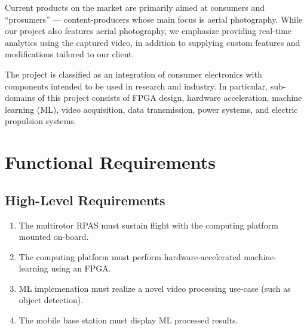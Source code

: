 \documentclass[10pt,letterpaper]{article}
\begin{document}
Current products on the market are primarily aimed at consumers and ``prosumers'' --- content-producers whose main focus is aerial photography. While our project also features aerial photography, we emphasize providing real-time analytics using the captured video, in addition to supplying custom features and modifications tailored to our client.

The project is classified as an integration of consumer electronics with components intended to be used in research and industry. In particular,  sub-domains of this project consists of FPGA design, hardware acceleration, machine learning (ML), video acquisition, data transmission, power systems, and electric propulsion systems. 

\newpage
\section{Functional Requirements}\label{section:funcreq} 

\subsection{High-Level Requirements}
\begin{enumerate}[label=F.HL.\arabic*, wide=1cm, widest=3cm, leftmargin=*, font=\bfseries, noitemsep,topsep=0pt, parsep=4pt, partopsep=0pt]
    \item The multirotor RPAS must sustain flight with the computing platform mounted on-board.
    \item The computing platform must perform hardware-accelerated machine-learning using an FPGA.
    \item ML implemenation must realize a novel video processing use-case (such as object detection).
    \item The mobile base station must display ML processed results.
\end{enumerate}
\end{document}
